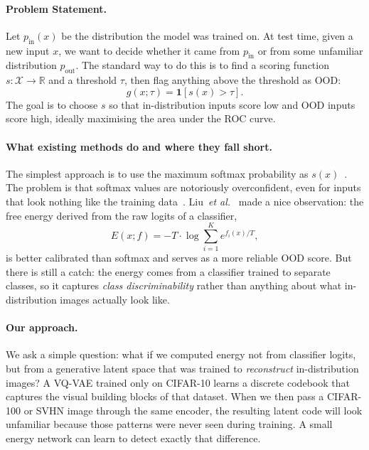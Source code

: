 \documentclass[10pt,twocolumn,letterpaper]{article}
\begin{document}
\paragraph{Problem Statement.}
Let $p_{\mathrm{in}}(x)$ be the distribution the model was trained on.
At test time, given a new input $x$, we want to decide whether it came
from $p_{\mathrm{in}}$ or from some unfamiliar distribution
$p_{\mathrm{out}}$. The standard way to do this is to find a scoring
function $s: \mathcal{X} \to \mathbb{R}$ and a threshold $\tau$, then
flag anything above the threshold as OOD:
\begin{equation}
  g(x;\tau) = \mathbf{1}\!\left[s(x) > \tau\right].
  \label{eq:detector}
\end{equation}
The goal is to choose $s$ so that in-distribution inputs score low and
OOD inputs score high, ideally maximising the area under the ROC curve.

\paragraph{What existing methods do and where they fall short.}
The simplest approach is to use the maximum softmax probability as
$s(x)$~\cite{hendrycks2017baseline}. The problem is that softmax values
are notoriously overconfident, even for inputs that look nothing like
the training data~\cite{nguyen2015deep}. Liu~\emph{et al.}~\cite{liu2020energy}
made a nice observation: the free energy derived from the raw logits of
a classifier,
\begin{equation}
  E(x; f) = -T \cdot \log\sum_{i=1}^{K} e^{f_i(x)/T},
  \label{eq:energy_base}
\end{equation}
is better calibrated than softmax and serves as a more reliable OOD
score. But there is still a catch: the energy comes from a classifier
trained to separate classes, so it captures \emph{class discriminability}
rather than anything about what in-distribution images actually look like.

\paragraph{Our approach.}
We ask a simple question: what if we computed energy not from classifier
logits, but from a generative latent space that was trained to
\emph{reconstruct} in-distribution images? A VQ-VAE trained only on
CIFAR-10 learns a discrete codebook that captures the visual building
blocks of that dataset. When we then pass a CIFAR-100 or SVHN image
through the same encoder, the resulting latent code will look unfamiliar
because those patterns were never seen during training. A small energy
network can learn to detect exactly that difference.
\end{document}
